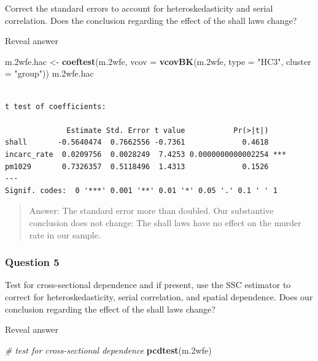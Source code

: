 \documentclass[]{article}
\newenvironment{Shaded}{\begin{snugshade}}{\end{snugshade}}
\newcommand{\KeywordTok}[1]{\textcolor[rgb]{0.13,0.29,0.53}{\textbf{#1}}}
\newcommand{\DataTypeTok}[1]{\textcolor[rgb]{0.13,0.29,0.53}{#1}}
\newcommand{\StringTok}[1]{\textcolor[rgb]{0.31,0.60,0.02}{#1}}
\newcommand{\CommentTok}[1]{\textcolor[rgb]{0.56,0.35,0.01}{\textit{#1}}}
\newcommand{\NormalTok}[1]{#1}
\theoremstyle{definition}
\theoremstyle{definition}
\theoremstyle{definition}
\theoremstyle{remark}
\begin{document}
Correct the standard errors to account for heteroskedasticity and serial
correlation. Does the conclusion regarding the effect of the shall laws
change?

 Reveal answer

\begin{Shaded}
\begin{Highlighting}[]
\NormalTok{m.2wfe.hac <-}\StringTok{ }\KeywordTok{coeftest}\NormalTok{(m.2wfe, }\DataTypeTok{vcov =} \KeywordTok{vcovBK}\NormalTok{(m.2wfe, }\DataTypeTok{type =} \StringTok{"HC3"}\NormalTok{, }\DataTypeTok{cluster =} \StringTok{"group"}\NormalTok{))}
\NormalTok{m.2wfe.hac}
\end{Highlighting}
\end{Shaded}

\begin{verbatim}

t test of coefficients:

              Estimate Std. Error t value           Pr(>|t|)    
shall       -0.5640474  0.7662556 -0.7361             0.4618    
incarc_rate  0.0209756  0.0028249  7.4253 0.0000000000002254 ***
pm1029       0.7326357  0.5118496  1.4313             0.1526    
---
Signif. codes:  0 '***' 0.001 '**' 0.01 '*' 0.05 '.' 0.1 ' ' 1
\end{verbatim}

\begin{quote}
Answer: The standard error more than doubled. Our substantive conclusion
does not change: The shall laws have no effect on the murder rate in our
sample.
\end{quote}

\subsubsection{Question 5}\label{question-5-1}

Test for cross-sectional dependence and if present, use the SSC
estimator to correct for heteroskedasticity, serial correlation, and
spatial dependence. Does our conclusion regarding the effect of the
shall laws change?

 Reveal answer

\begin{Shaded}
\begin{Highlighting}[]
\CommentTok{# test for cross-sectional dependence}
\KeywordTok{pcdtest}\NormalTok{(m.2wfe)}
\end{Highlighting}
\end{Shaded}
\end{document}
